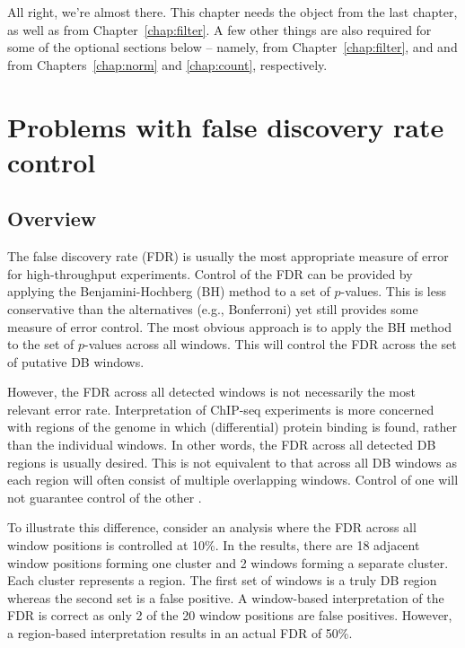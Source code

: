\documentclass{report}\usepackage[]{graphicx}\usepackage[usenames,dvipsnames]{color}
\newenvironment{combox}
{ \definecolor{shadecolor}{RGB}{255, 240, 240} \begin{shaded}\begin{center}\begin{minipage}[t]{0.95\textwidth} }
{ \end{minipage}\end{center}\end{shaded} \definecolor{shadecolor}{RGB}{240,240,240} }
\begin{document}
\begin{combox}
All right, we're almost there. 
This chapter needs the  object from the last chapter, as well as  from Chapter~\ref{chap:filter}.
A few other things are also required for some of the optional sections below -- namely,  from Chapter~\ref{chap:filter}, and  and  from Chapters~\ref{chap:norm} and \ref{chap:count}, respectively.
\end{combox}

\section{Problems with false discovery rate control}

\subsection{Overview}
The false discovery rate (FDR) is usually the most appropriate measure of error for high-throughput experiments. 
Control of the FDR can be provided by applying the Benjamini-Hochberg (BH) method \cite{benjamini1995} to a set of $p$-values. 
This is less conservative than the alternatives (e.g., Bonferroni) yet still provides some measure of error control. 
The most obvious approach is to apply the BH method to the set of $p$-values across all windows. 
This will control the FDR across the set of putative DB windows.

However, the FDR across all detected windows is not necessarily the most relevant error rate. 
Interpretation of ChIP-seq experiments is more concerned with regions of the genome in which (differential) protein binding is found, rather than the individual windows.
In other words, the FDR across all detected DB regions is usually desired. 
This is not equivalent to that across all DB windows as each region will often consist of multiple overlapping windows.
Control of one will not guarantee control of the other \cite{lun2014}.

To illustrate this difference, consider an analysis where the FDR across all window positions is controlled at 10\%. 
In the results, there are 18 adjacent window positions forming one cluster and 2 windows forming a separate cluster.
Each cluster represents a region. 
The first set of windows is a truly DB region whereas the second set is a false positive. 
A window-based interpretation of the FDR is correct as only 2 of the 20 window positions are false positives.
However, a region-based interpretation results in an actual FDR of 50\%.
\end{document}
